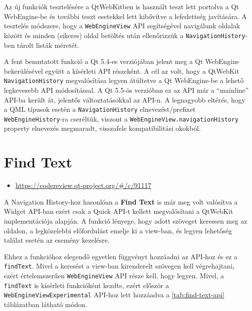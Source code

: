 \documentclass[12pt]{report}
\let\origurl\url
\renewcommand{\url}[1]{%
    \textcolor{blue}{\origurl{#1}}
}
\newcommand{\gerrit}[1]{%
    \textcolor{qtgreen}{\origurl{https://codereview.qt-project.org/\#/c/#1}}
}
\begin{document}
Az új funkciók tesztelésére a QtWebKitben is használt teszt lett portolva a
Qt WebEngine-be és további teszt esetekkel lett kibővítve a lefedettség javítására.
A tesztelés módszere, hogy a \texttt{WebEngineView} API segítségével navigálunk oldalak
között és minden (sikeres) oldal betöltés után ellenőrizzük a \texttt{NavigationHistory}-ben
tárolt listák méretét.

A fent bemutatott funkció a Qt 5.4-es verziójában jelent meg a Qt WebEngine bekerülésével
együtt a kísérleti API részeként. A cél az volt, hogy a QtWebKit
\texttt{NavigationHistory} megvalósítása legyen átültetve a Qt WebEngine-be a lehető
legkevesebb API módosítással.
A Qt 5.5-ös verzióban ez az API már a ``mainline'' API-ba került át, jelentős
változtatásokkal az API-n. A legnagyobb eltérés, hogy a QML típusok esetén a
\texttt{NavigationHistory} elnevezést/prefixet \texttt{WebEngineHistory}-ra cseréltük,
viszont a \texttt{WebEngineView.navigationHistory} property elnevezés megmaradt, visszafele
kompatibilitási okokból.


\section{Find Text}

\begin{center}
    \begin{reviewbox}
        \begin{itemize}
            \renewcommand{\labelitemi}{\textcolor{qtgreen}{$\blacktriangleright$}}
            \item \gerrit{91117}
        \end{itemize}
    \end{reviewbox}
\end{center}

\noindent
A Navigation History-hoz hasonlóan a \textbf{Find Text} is már meg volt valósítva a Widget
API-ban ezért csak a Quick API-t kellett megvalósítani a QtWebKit implementációja alapján.
A funkció lényege, hogy adott szöveget keressen meg az oldalon, a legközelebbi előfordulást
emelje ki a view-ban, és legyen lehetőség találat esetén az esemény kezelésre.

Ehhez a funkcióhoz elegendő egyetlen függvényt hozzáadni az API-hoz és ez a
\texttt{findText}. Mivel a keresést a view-ban kirenderelt szövegen kell végrehajtani,
ezért értelemszerűen \texttt{WebEngineView} API része kell, hogy legyen. Mivel, a
\texttt{findText} is kísérleti funkcióként kezdte, ezért először a
\texttt{WebEngineViewExperimental} API-hoz lett hozzáadva a \ref{tab:find-text-api}
táblázatban látható módon.
\end{document}
